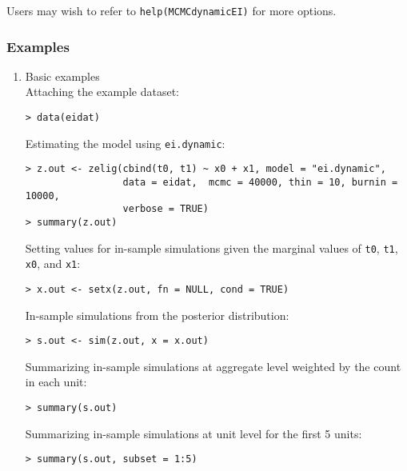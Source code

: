 \noindent Users may wish to refer to \texttt{help(MCMCdynamicEI)} for more options.



\subsubsection{Examples}

\begin{enumerate}
 \item Basic examples \\
 Attaching the example dataset:
\begin{verbatim} 
> data(eidat)
\end{verbatim}
Estimating the model using \texttt{ei.dynamic}:
\begin{verbatim}
> z.out <- zelig(cbind(t0, t1) ~ x0 + x1, model = "ei.dynamic", 
                 data = eidat,  mcmc = 40000, thin = 10, burnin = 10000, 
                 verbose = TRUE)
> summary(z.out)
\end{verbatim}

Setting values for in-sample simulations given the marginal values 
of {\tt t0}, {\tt t1}, {\tt x0}, and {\tt x1}:
\begin{verbatim}
> x.out <- setx(z.out, fn = NULL, cond = TRUE)
\end{verbatim}

In-sample simulations from the posterior distribution:
\begin{verbatim}
> s.out <- sim(z.out, x = x.out)
\end{verbatim}

Summarizing in-sample simulations at aggregate level 
weighted by the count in each unit:
\begin{verbatim}
> summary(s.out)
\end{verbatim}

Summarizing in-sample simulations at unit level for the first 5 units:
\begin{verbatim}
> summary(s.out, subset = 1:5)
\end{verbatim}

\end{enumerate}
\clearpage
